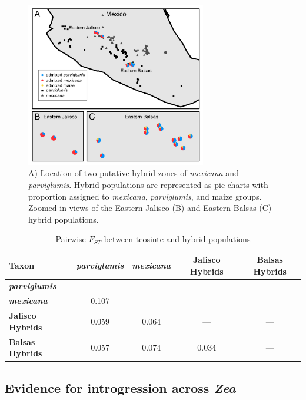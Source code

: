 \begin{figure}[h!]
  \centering
   \includegraphics[width=0.7\textwidth]{Figure1.jpg}
    \caption{A) Location of two putative hybrid zones of \emph{mexicana} and \emph{parviglumis}.  Hybrid populations are represented as pie charts with proportion assigned to \emph{mexicana}, \emph{parviglumis}, and maize groups. Zoomed-in views of the Eastern Jalisco (B) and Eastern Balsas (C) hybrid populations.} 
\label{fig:pies}
\end{figure}

\begin{table}[h!]
\begin{center}
\caption{Pairwise $F_{ST}$ between teosinte and hybrid populations} \label{tab:Fst}
\begin{tabular}{lcccc}\\\toprule
{\bf Taxon}&{\bf \emph{parviglumis}}&{\bf \emph{mexicana}}&{\bf Jalisco Hybrids}&{\bf Balsas Hybrids}\\\midrule
{\bf \emph{parviglumis}}&---&---&---&---\\
{\bf \emph{mexicana}}&0.107&---&---&---\\
{\bf Jalisco Hybrids}&0.059&0.064&---&---\\
{\bf Balsas Hybrids}&0.057&0.074&0.034&---\\\bottomrule
\end{tabular}
\end{center}
\end{table} 

\subsection*{Evidence for introgression across \emph{Zea}}

